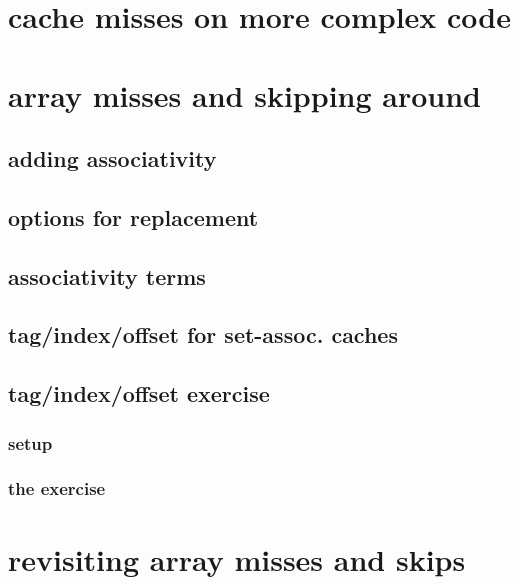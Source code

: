 \section{cache misses on more complex code}


\section{array misses and skipping around}


\subsection{adding associativity}



\subsection{options for replacement}



\subsection{associativity terms}


\subsection{tag/index/offset for set-assoc. caches}


\subsection{tag/index/offset exercise}
\subsubsection{setup}

\subsubsection{the exercise}


\section{revisiting array misses and skips}
